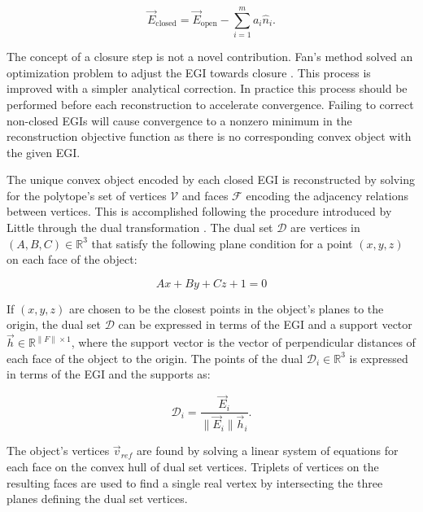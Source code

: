 \begin{equation} \label{eq:egi_validation}
  \vec{E}_{\textrm{closed}} = \vec{E}_{\textrm{open}} - \sum_{i=1}^m a_i \hat{n}_i .
\end{equation}

The concept of a closure step is not a novel contribution. Fan's method solved an optimization problem to adjust the EGI towards closure \cite{fan2020thesis}. This process is improved with a simpler analytical correction. In practice this process should be performed before each reconstruction to accelerate convergence. Failing to correct non-closed EGIs will cause convergence to a nonzero minimum in the reconstruction objective function as there is no corresponding convex object with the given EGI.

The unique convex object encoded by each closed EGI is reconstructed by solving for the polytope's set of vertices $\mathcal{V}$ and faces $\mathcal{F}$ encoding the adjacency relations between vertices. This is accomplished following the procedure introduced by Little through the dual transformation \cite{little1983}. The dual set $\mathcal{D}$ are vertices in $(A, B, C) \in \mathbb{R}^3$ that satisfy the following plane condition for a point $(x, y, z)$ on each face of the object:

\begin{equation} \label{eq:dual_abc_form}
  Ax + By + Cz + 1 = 0
\end{equation}

If $(x, y, z)$ are chosen to be the closest points in the object's planes to the origin, the dual set $\mathcal{D}$ can be expressed in terms of the EGI and a support vector $\vec{h} \in \mathbb{R}^{\|F\| \times 1}$, where the support vector is the vector of perpendicular distances of each face of the object to the origin. The points of the dual $\mathcal{D}_i \in \mathbb{R}^3$ is expressed in terms of the EGI and the supports as:

\begin{equation} \label{eq:dual_egi_form}
  \mathcal{D}_i = \frac{\vec{E}_i}{ \| \vec{E}_i \| \vec{h}_i}.
\end{equation}

The object's vertices $\vec{v}_{ref}$ are found by solving a linear system of equations for each face on the convex hull of dual set vertices. Triplets of vertices on the resulting faces are used to find a single real vertex by intersecting the three planes defining the dual set vertices.

